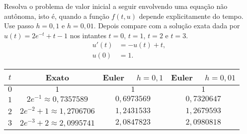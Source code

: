 \begin{exer} Resolva o problema de valor inicial a seguir envolvendo uma equação não autônoma, isto é, quando a função $f(t,u)$ depende explicitamente do tempo. Use passo $h=0,1$ e $h=0,01$. Depois compare com a solução exata dada por $u(t)=2e^{-t}+t-1$ nos intantes $t=0$, $t=1$, $t=2$ e $t=3$.
  \begin{equation}
   \begin{split}
    u'(t)&=-u(t)+t,\\
    u(0)&=1.
   \end{split}
  \end{equation}

\end{exer}
\begin{resp}
\begin{center}
  \begin{tabular}{|c|c|c|c|}\hline
    $t$ &  Exato & Euler~~ $h=0,1$ & Euler~~ $h=0,01$\\\hline
    $0$ &  $1$ & $1$ & $1$\\\hline
    $1$ &   $2e^{-1}\approx 0,7357589$ & $0,6973569$   &   $0,7320647$  \\\hline
    $2$ &   $2e^{-2}+1\approx  1,2706706$ & $ 1,2431533 $   &  $ 1,2679593$     \\\hline
    $3$ &   $2e^{-3}+2\approx 2,0995741$  & $ 2,0847823$ & $2,0980818$   \\\hline
  \end{tabular}
\end{center}
\end{resp}

